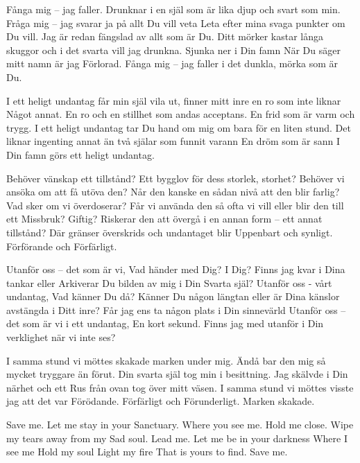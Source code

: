 \startpoem
Fånga mig – jag faller.
Drunknar i en själ som är lika
djup och svart som min.
Fråga mig – jag svarar
ja på allt Du vill veta
Leta efter mina svaga punkter om Du vill.
Jag är redan fängslad av 
allt som är Du.
Ditt mörker kastar långa skuggor och
i det svarta vill jag drunkna.
Sjunka ner i Din famn
När Du säger mitt namn är jag
Förlorad.
Fånga mig – jag faller i det
dunkla, mörka som är 
Du.
\stoppoem

\startpoem
I ett heligt undantag
får min själ vila ut,
finner mitt inre en ro som inte liknar
Något annat.
En ro och en stillhet 
som andas acceptans.
En frid som är varm och trygg.
I ett heligt undantag
tar Du hand om mig om bara för 
en liten stund.
Det liknar ingenting annat än
två själar som funnit varann
En dröm som är sann
I Din famn görs 
ett heligt undantag.
\stoppoem

\startpoem
Behöver vänskap ett tillstånd?
Ett bygglov för dess storlek, storhet?
Behöver vi ansöka om att få utöva den?
Når den kanske en sådan nivå att den
blir farlig?
Vad sker om vi överdoserar?
Får vi använda den så ofta vi vill eller blir den till ett
Missbruk?
Giftig?
Riskerar den att övergå i en annan form –
ett annat tillstånd?
Där gränser överskrids och undantaget blir
Uppenbart och synligt.
Förförande och 
Förfärligt.
\stoppoem

\startpoem
Utanför oss – det som är vi,
Vad händer med Dig? I Dig?
Finns jag kvar i Dina tankar eller
Arkiverar Du bilden av mig i 
Din Svarta själ?
Utanför oss -  vårt undantag,
Vad känner Du då?
Känner Du någon längtan eller är
Dina känslor avstängda i Ditt inre?
Får jag ens ta någon plats i Din sinnevärld
Utanför oss – det som är vi i ett undantag, 
En kort sekund.
Finns jag med utanför i Din verklighet
när vi inte ses?
\stoppoem

\startpoem
I samma stund vi möttes
skakade marken under mig.
Ändå bar den mig så mycket tryggare än förut.
Din svarta själ tog min i besittning.
Jag skälvde i Din närhet och ett
Rus från ovan tog över mitt väsen.
I samma stund vi möttes visste jag att det var
Förödande.
Förfärligt och
Förunderligt.
Marken skakade.
\stoppoem

\startpoem
Save me.
Let me stay in your 
Sanctuary.
Where you see me.
Hold me close.
Wipe my tears away from my
Sad soul.
Lead me.
Let me be in your darkness
Where I see me
Hold my soul
Light my fire
That is yours to find.
Save me.
\stoppoem

